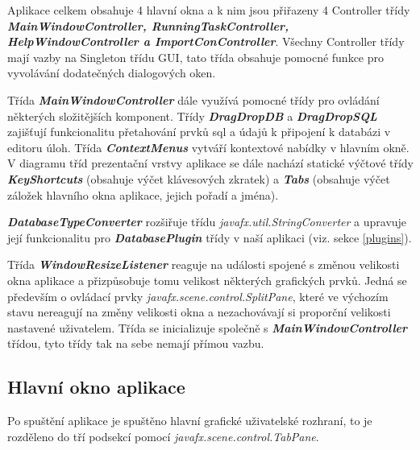 \documentclass[czech,bachelor,public,dept460,male,cpdeclaration,twoside]{diploma}
\begin{document}
Aplikace celkem obsahuje 4 hlavní okna a k nim jsou přiřazeny 4 Controller třídy \newline \textbf{\emph{MainWindowController, RunningTaskController, HelpWindowController a ImportConController}}. Všechny Controller třídy mají vazby na Singleton třídu GUI, tato třída obsahuje pomocné funkce pro vyvolávání dodatečných dialogových oken. 

Třída \textbf{\emph{MainWindowController}} dále využívá pomocné třídy pro ovládání některých složitějších komponent. Třídy \textbf{\emph{DragDropDB}} a \textbf{\emph{DragDropSQL}} zajišťují funkcionalitu přetahování prvků sql a údajů k připojení k databázi v editoru úloh. Třída \textbf{\emph{ContextMenus}} vytváří kontextové nabídky v hlavním okně. V diagramu tříd prezentační vrstvy aplikace se dále nachází statické výčtové třídy \textbf{\emph{KeyShortcuts}} (obsahuje výčet klávesových zkratek) a \textbf{\emph{Tabs}} (obsahuje výčet záložek hlavního okna aplikace, jejich pořadí a jména).

\textbf{\emph{DatabaseTypeConverter}} rozšiřuje třídu \textit{javafx.util.StringConverter} a upravuje její funkcionalitu pro \textbf{\emph{DatabasePlugin}} třídy v naší aplikaci (viz. sekce \ref{plugins}).

Třída \textbf{\emph{WindowResizeListener}} reaguje na události spojené s změnou velikosti okna aplikace a přizpůsobuje tomu velikost některých grafických prvků. Jedná se především o ovládací prvky \textit{javafx.scene.control.SplitPane}, které ve výchozím stavu nereagují na změny velikosti okna a nezachovávají si proporční velikosti nastavené uživatelem. Třída se inicializuje společně s \textbf{\emph{MainWindowController}} třídou, tyto třídy tak na sebe nemají přímou vazbu.


\subsection{Hlavní okno aplikace}
Po spuštění aplikace je spuštěno hlavní grafické uživatelské rozhraní, to je rozděleno do tří podsekcí pomocí \textit{javafx.scene.control.TabPane}.
\end{document}
